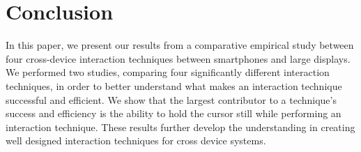 \section{Conclusion}\label{sec:conclusion}
In this paper, we present our results from a comparative empirical study between four cross-device interaction techniques between smartphones and large displays. 
We performed two studies, comparing four significantly different interaction techniques, in order to better understand what makes an interaction technique successful and efficient. 
We show that the largest contributor to a technique's success and efficiency is the ability to hold the cursor still while performing an interaction technique.
These results further develop the understanding in creating well designed interaction techniques for cross device systems.